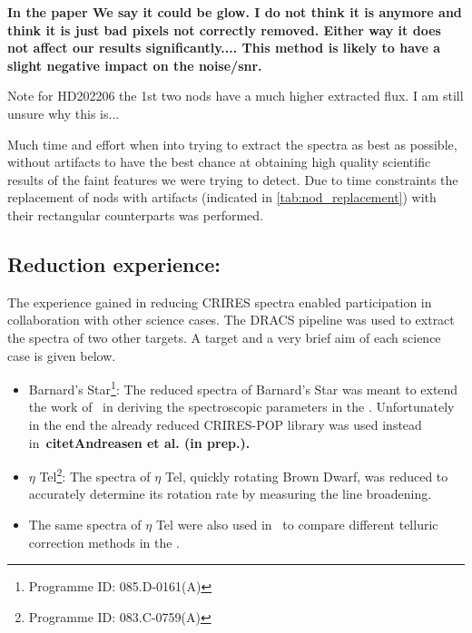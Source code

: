 

\textbf{In the paper We say it could be glow. I do not think it is anymore and think it is just bad pixels not correctly removed. Either way it does not affect our results significantly....
This method is likely to have a slight negative impact on the noise/snr.}

Note for HD202206 the 1st two nods have a much higher extracted flux. I am still unsure why this is...


Much time and effort when into trying to extract the spectra as best as possible, without artifacts to have the best chance at obtaining high quality scientific results of the faint features we were trying to detect.
Due to time constraints the replacement of nods with artifacts (indicated in \ref{tab:nod_replacement}) with their rectangular counterparts was performed.  

\subsection{Reduction experience:}
\label{subsec:experience}
The experience gained in reducing CRIRES spectra enabled participation in collaboration with other science cases. The DRACS pipeline was used to extract the spectra of two other targets. A target and a very brief aim of each science case is given below.
\begin{itemize}
\item Barnard's Star\footnote{Programme ID: 085.D-0161(A)}: The reduced {\nir} spectra of Barnard's Star was meant to extend the work of~\citet{andreasen_nearinfrared_2016} in deriving the spectroscopic parameters in the \nir. Unfortunately in the end the already reduced CRIRES-POP library was used instead in~\bf{citet{Andreasen et al. (in prep.)}}. 
\item $\eta$ Tel\footnote{Programme ID: 083.C-0759(A)}: The spectra of {$\eta$ Tel}, quickly rotating Brown Dwarf, was reduced to accurately determine its rotation rate by measuring the line broadening. 
\item The same spectra of $\eta$ Tel were also used in~\citet{ulmer-moll_telluric_2018} to compare different telluric correction methods in the \nir.
\end{itemize}

